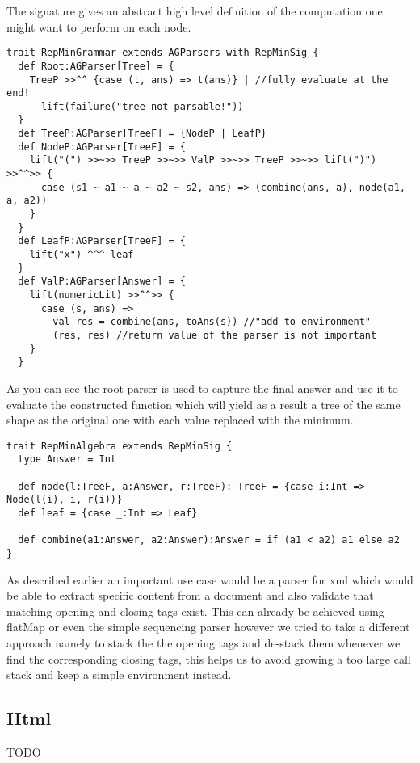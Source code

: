 The signature gives an abstract high level definition of the computation one might want to perform on each node.

\begin{lstlisting}
trait RepMinGrammar extends AGParsers with RepMinSig {
  def Root:AGParser[Tree] = {
    TreeP >>^^ {case (t, ans) => t(ans)} | //fully evaluate at the end!
      lift(failure("tree not parsable!"))
  }
  def TreeP:AGParser[TreeF] = {NodeP | LeafP}
  def NodeP:AGParser[TreeF] = {
    lift("(") >>~>> TreeP >>~>> ValP >>~>> TreeP >>~>> lift(")") >>^^>> {
      case (s1 ~ a1 ~ a ~ a2 ~ s2, ans) => (combine(ans, a), node(a1, a, a2))
    }
  }
  def LeafP:AGParser[TreeF] = {
    lift("x") ^^^ leaf
  }
  def ValP:AGParser[Answer] = {
    lift(numericLit) >>^^>> {
      case (s, ans) =>
        val res = combine(ans, toAns(s)) //"add to environment"
        (res, res) //return value of the parser is not important
    }
  }
\end{lstlisting}
As you can see the root parser is used to capture the final answer and use it to evaluate the constructed function which will yield as a result a tree of the same shape as the original one with each value replaced with the minimum.

\begin{lstlisting}
trait RepMinAlgebra extends RepMinSig {
  type Answer = Int

  def node(l:TreeF, a:Answer, r:TreeF): TreeF = {case i:Int => Node(l(i), i, r(i))}
  def leaf = {case _:Int => Leaf}

  def combine(a1:Answer, a2:Answer):Answer = if (a1 < a2) a1 else a2
}
\end{lstlisting}

As described earlier an important use case would be a parser for xml which would be able to extract specific content from a document and also validate that matching opening and closing tags exist. This can already be achieved using flatMap or even the simple sequencing parser however we tried to take a different approach namely to stack the the opening tags and de-stack them whenever we find the corresponding closing tags, this helps us to avoid growing a too large call stack and keep a simple environment instead.

\subsection{Html}
TODO
